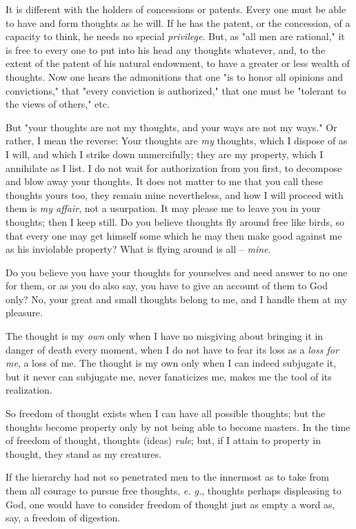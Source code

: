 \documentclass[a4paper]{book}
\begin{document}
It is different with the holders of concessions or patents. Every one must be 
able to have and form thoughts as he will. If he has the patent, or the 
concession, of a capacity to think, he needs no special \textit{privilege}. 
But, as "{}all men are rational,"{} it is free to every one to put into his 
head any thoughts whatever, and, to the extent of the patent of his natural 
endowment, to have a greater or less wealth of thoughts. Now one hears the 
admonitions that one "{}is to honor all opinions and convictions,"{} that 
"{}every conviction is authorized,"{} that one must be "{}tolerant to the 
views of others,"{} etc.

But "{}your thoughts are not my thoughts, and your ways are not my ways."{} Or 
rather, I mean the reverse: Your thoughts are \textit{my} thoughts, which I 
dispose of as I will, and which I strike down unmercifully; they are my 
property, which I annihilate as I list. I do not wait for authorization from 
you first, to decompose and blow away your thoughts. It does not matter to me 
that you call these thoughts yours too, they remain mine nevertheless, and how 
I will proceed with them is \textit{my affair}, not a usurpation. It may 
please me to leave you in your thoughts; then I keep still. Do you believe 
thoughts fly around free like birds, so that every one may get himself some 
which he may then make good against me as his inviolable property? What is 
flying around is all -- \textit{mine}.

Do you believe you have your thoughts for yourselves and need answer to no one 
for them, or as you do also say, you have to give an account of them to God 
only? No, your great and small thoughts belong to me, and I handle them at my 
pleasure.

The thought is my \textit{own} only when I have no misgiving about bringing it 
in danger of death every moment, when I do not have to fear its loss as a 
\textit{loss for me}, a loss of me. The thought is my own only when I can 
indeed subjugate it, but it never can subjugate me, never fanaticizes me, 
makes me the tool of its realization.

So freedom of thought exists when I can have all possible thoughts; but the 
thoughts become property only by not being able to become masters. In the time 
of freedom of thought, thoughts (ideas) \textit{rule}; but, if I attain to 
property in thought, they stand as my creatures.

If the hierarchy had not so penetrated men to the innermost as to take from 
them all courage to pursue free thoughts, \textit{e. g.}, thoughts perhaps 
displeasing to God, one would have to consider freedom of thought just as 
empty a word as, say, a freedom of digestion.
\end{document}
